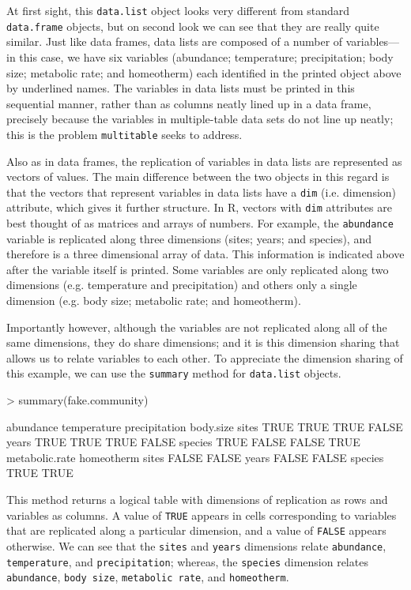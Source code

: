 \documentclass{article}
\newcommand{\R}{{\sf R}}
\newcommand{\code}[1]{\texttt{#1}}
\numberwithin{exercise}{section}
\begin{document}
At first sight, this \code{data.list} object looks very different from standard \code{data.frame} objects, but on second look we can see that they are really quite similar.  Just like data frames, data lists are composed of a number of variables---in this case, we have six variables (abundance; temperature; precipitation; body size; metabolic rate; and homeotherm) each identified in the printed object above by underlined names.  The variables in data lists must be printed in this sequential manner, rather than as columns neatly lined up in a data frame, precisely because the variables in multiple-table data sets do not line up neatly; this is the problem \code{multitable} seeks to address.

Also as in data frames, the replication of variables in data lists are represented as vectors of values.  The main difference between the two objects in this regard is that the vectors that represent variables in data lists have a \code{dim} (i.e. dimension) attribute, which gives it further structure.  In \R, vectors with \code{dim} attributes are best thought of as matrices and arrays of numbers.  For example, the \code{abundance} variable is replicated along three dimensions (sites; years; and species), and therefore is a three dimensional array of data.  This information is indicated above after the variable itself is printed.  Some variables are only replicated along two dimensions (e.g. temperature and precipitation) and others only a single dimension (e.g. body size; metabolic rate; and homeotherm).  

Importantly however, although the variables are not replicated along all of the same dimensions, they do share dimensions; and it is this dimension sharing that allows us to relate variables to each other.  To appreciate the dimension sharing of this example, we can use the \code{summary} method for \code{data.list} objects.
\begin{Schunk}
\begin{Sinput}
> summary(fake.community)
\end{Sinput}
\begin{Soutput}
        abundance temperature precipitation body.size
sites        TRUE        TRUE          TRUE     FALSE
years        TRUE        TRUE          TRUE     FALSE
species      TRUE       FALSE         FALSE      TRUE
        metabolic.rate homeotherm
sites            FALSE      FALSE
years            FALSE      FALSE
species           TRUE       TRUE
\end{Soutput}
\end{Schunk}
\noindent This method returns a logical table with dimensions of replication as rows and variables as columns.  A value of \code{TRUE} appears in cells corresponding to variables that are replicated along a particular dimension, and a value of \code{FALSE} appears otherwise.  We can see that the \code{sites} and \code{years} dimensions relate \code{abundance}, \code{temperature}, and \code{precipitation}; whereas, the \code{species} dimension relates \code{abundance}, \code{body size}, \code{metabolic rate}, and \code{homeotherm}.
\end{document}
